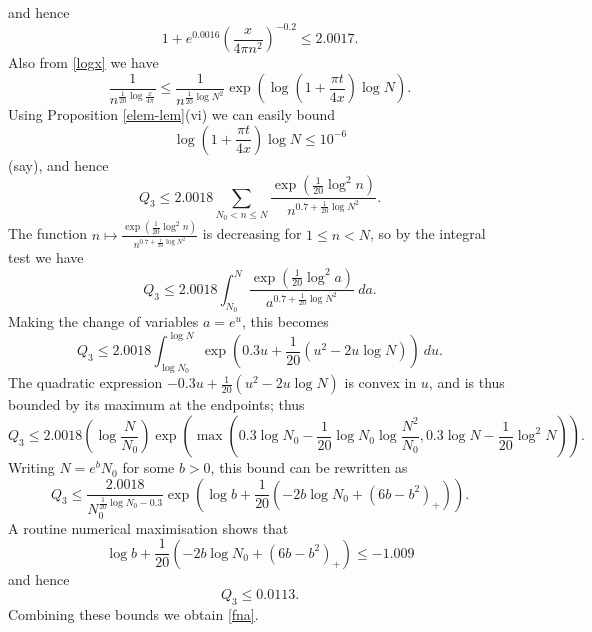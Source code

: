 and hence
$$ 1 + e^{0.0016} (\frac{x}{4\pi n^2})^{-0.2} \leq 2.0017.$$
Also from \eqref{logx} we have
$$ \frac{1}{n^{\frac{1}{20} \log \frac{x}{4\pi}}} \leq \frac{1}{n^{\frac{1}{20} \log N^2}} \exp(\log(1 + \frac{\pi t}{4x}) \log N).$$
Using Proposition \ref{elem-lem}(vi) we can easily bound
$$ \log(1 + \frac{\pi t}{4x}) \log N \leq 10^{-6}$$
(say), and hence
$$ Q_3 \leq 2.0018 \sum_{N_0 < n \leq N} \frac{\exp( \frac{1}{20} \log^2 n)}{n^{0.7 + \frac{1}{20} \log N^2}}.$$
The function $n \mapsto \frac{\exp( \frac{1}{20} \log^2 n)}{n^{0.7 + \frac{1}{20} \log N^2}}$ is decreasing for $1 \leq n < N$, so by the integral test we have
$$ Q_3 \leq 2.0018 \int_{N_0}^N \frac{\exp( \frac{1}{20} \log^2 a)}{a^{0.7 + \frac{1}{20} \log N^2}}\ da.$$
Making the change of variables $a = e^u$, this becomes
$$ Q_3 \leq 2.0018 \int_{\log N_0}^{\log N} \exp( 0.3 u + \frac{1}{20} (u^2 - 2u \log N) )\ du.$$
The quadratic expression $- 0.3 u + \frac{1}{20} (u^2 - 2u \log N)$ is convex in $u$, and is thus bounded by its maximum at the endpoints; thus
$$ Q_3 \leq 2.0018 (\log \frac{N}{N_0}) \exp( \max( 0.3 \log N_0 -\frac{1}{20} \log N_0 \log \frac{N^2}{N_0}, 0.3 \log N - \frac{1}{20} \log^2 N ) ).$$
Writing $N = e^b N_0$ for some $b>0$, this bound can be rewritten as 
$$ Q_3 \leq \frac{2.0018}{N_0^{\frac{1}{20} \log N_0 - 0.3}} \exp( \log b + \frac{1}{20} ( -2b \log N_0 + (6b-b^2)_+ ) ).$$
A routine numerical maximisation shows that
$$ \log b + \frac{1}{20} ( -2b \log N_0 + (6b-b^2)_+ ) \leq -1.009$$
and hence
$$ Q_3 \leq 0.0113.$$
Combining these bounds we obtain \eqref{fna}.


